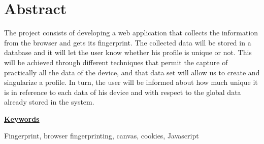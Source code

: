 \chapter*{Abstract}

The project consists of developing a web application that collects the information from the browser and gets its fingerprint. The collected data will be stored in a database and it will let the user know whether his profile is unique or not. This will be achieved through different techniques that permit the capture of practically all the data of the device, and that data set will allow us to create and singularize a profile. In turn, the user will be informed about how much unique it is in reference to each data of his device and with respect to the global data already stored in the system. \par
\vspace{12mm}
\noindent
\underline{\Large{\textbf{Keywords}}}\par
\vspace{7mm}
\noindent
\normalsize{Fingerprint, browser fingerprinting, canvas, cookies, Javascript}